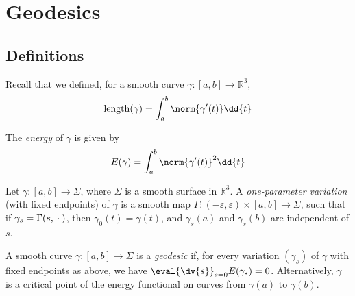 \section{Geodesics}

\subsection{Definitions}
Recall that we defined, for a smooth curve $\gamma \colon [a,b] \to \mathbb R^3$,
\begin{align*}
	\mathrm{length}(\gamma) = \int_a^b \norm{\gamma'(t)} \dd{t}
\end{align*}
\begin{definition}
	The \textit{energy} of $\gamma$ is given by
	\begin{align*}
		E(\gamma) = \int_a^b \norm{\gamma'(t)}^2 \dd{t}
	\end{align*}
\end{definition}
\begin{definition}
	Let $\gamma \colon [a,b] \to \Sigma$, where $\Sigma$ is a smooth surface in $\mathbb R^3$.
	A \textit{one-parameter variation} (with fixed endpoints) of $\gamma$ is a smooth map $\Gamma \colon (-\varepsilon, \varepsilon) \times [a,b] \to \Sigma$, such that if $\gamma_s = \Gamma(s,{}\cdot{})$, then
	$\gamma_0(t) = \gamma(t)$, and $\gamma_s(a)$ and $\gamma_s(b)$ are independent of $s$.
\end{definition}
\begin{definition}
	A smooth curve $\gamma \colon [a,b] \to \Sigma$ is a \textit{geodesic} if, for every variation $(\gamma_s)$ of $\gamma$ with fixed endpoints as above, we have $\eval{\dv{s}}_{s=0} E(\gamma_s) = 0$.
	Alternatively, $\gamma$ is a critical point of the energy functional on curves from $\gamma(a)$ to $\gamma(b)$.
\end{definition}

